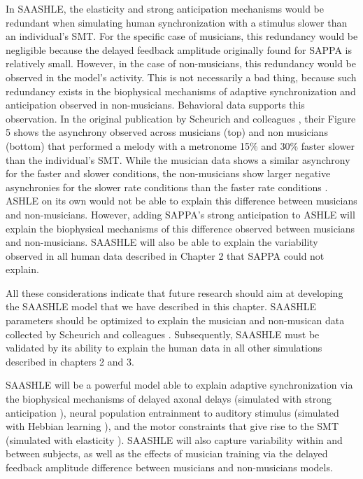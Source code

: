 \documentclass{report}
\begin{document}
In SAASHLE, the elasticity and strong anticipation mechanisms would be redundant when simulating human synchronization with a stimulus slower than an individual's SMT. For the specific case of musicians, this redundancy would be negligible because the delayed feedback amplitude originally found for SAPPA is relatively small. However, in the case of non-musicians, this redundancy would be observed in the model's activity. This is not necessarily a bad thing, because such redundancy exists in the biophysical mechanisms of adaptive synchronization and anticipation observed in non-musicians. Behavioral data supports this observation. In the original publication by Scheurich and colleagues \cite{scheurich2018tapping}, their Figure 5 shows the asynchrony observed across musicians (top) and non musicians (bottom) that performed a melody with a metronome 15\% and 30\% faster slower than the individual’s SMT. While the musician data shows a similar asynchrony for the faster and slower conditions, the non-musicians show larger negative asynchronies for the slower rate conditions than the faster rate conditions \cite{scheurich2018tapping}. ASHLE on its own would not be able to explain this difference between musicians and non-musicians. However, adding SAPPA's strong anticipation to ASHLE will explain the biophysical mechanisms of this difference observed between musicians and non-musicians. SAASHLE will also be able to explain the variability observed in all human data described in Chapter 2 that SAPPA could not explain. 

All these considerations indicate that future research should aim at developing the SAASHLE model that we have described in this chapter. SAASHLE parameters should be optimized to explain the musician and non-musican data collected by Scheurich and colleagues \cite{scheurich2018tapping}. Subsequently, SAASHLE must be validated by its ability to explain the human data in all other simulations described in chapters 2 and 3. 

SAASHLE will be a powerful model able to explain adaptive synchronization via the biophysical mechanisms of delayed axonal delays (simulated with strong anticipation \cite{stepp2010strong}), neural population entrainment to auditory stimulus (simulated with Hebbian learning \cite{righetti2006dynamic}), and the motor constraints that give rise to the SMT (simulated with elasticity \cite{lambert2016adaptive}). SAASHLE will also capture variability within and between subjects, as well as the effects of musician training via the delayed feedback amplitude difference between musicians and non-musicians models. 
\end{document}
